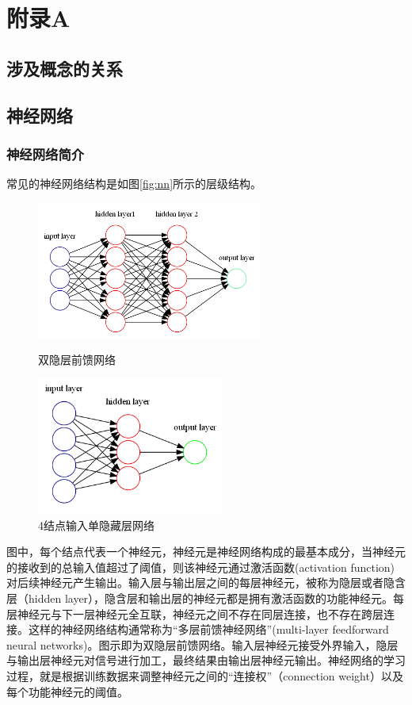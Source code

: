 \documentclass[12pt,a4paper,titlepage]{article}
\begin{document}
\newpage
\section*{附录A}

\subsection*{涉及概念的关系}


\subsection*{神经网络}
\subsubsection*{神经网络简介}

常见的神经网络结构是如图\ref{fig:nn}所示的层级结构。
\begin{figure}[htbp]
\begin{minipage}[t]{0.35\linewidth}
\centering
\includegraphics[height=4.5cm]{img/neural_network.png}
\caption{双隐层前馈网络}
\label{fig:nn}
\end{minipage}%
\hfill
\begin{minipage}[t]{0.5\linewidth}
\centering
\includegraphics[height=4.5cm]{img/nn431.png}
\caption{4结点输入单隐藏层网络}
\label{fig:sample}
\end{minipage}
\end{figure}
图中，每个结点代表一个神经元，神经元是神经网络构成的最基本成分，当神经元的接收到的总输入值超过了阈值，则该神经元通过激活函数(activation function)对后续神经元产生输出。输入层与输出层之间的每层神经元，被称为隐层或者隐含层（hidden layer），隐含层和输出层的神经元都是拥有激活函数的功能神经元。每层神经元与下一层神经元全互联，神经元之间不存在同层连接，也不存在跨层连接。这样的神经网络结构通常称为“多层前馈神经网络”(multi-layer feedforward neural networks)。图示即为双隐层前馈网络。输入层神经元接受外界输入，隐层与输出层神经元对信号进行加工，最终结果由输出层神经元输出。神经网络的学习过程，就是根据训练数据来调整神经元之间的“连接权”（connection weight）以及每个功能神经元的阈值。\par
\end{document}
